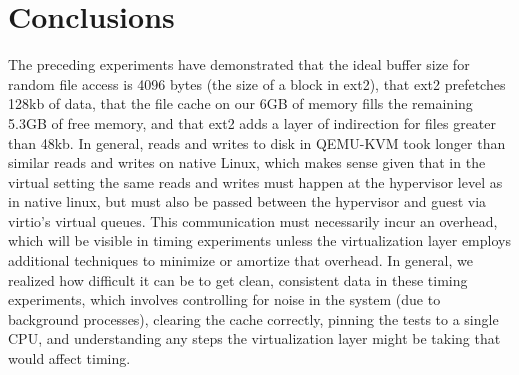 \documentclass[letterpaper,twocolumn,10pt]{article}
\begin{document}
\section{Conclusions}
The preceding experiments have demonstrated that the ideal buffer size for random file access is 4096 bytes (the size of a block in ext2), that ext2 prefetches 128kb of data, that the file cache on our 6GB of memory fills the remaining 5.3GB of free memory, and that ext2 adds a layer of indirection for files greater than 48kb. In general, reads and writes to disk in QEMU-KVM took longer than similar reads and writes on native Linux, which makes sense given that in the virtual setting the same reads and writes must happen at the hypervisor level as in native linux, but must also be passed between the hypervisor and guest via virtio's virtual queues. This communication must necessarily incur an overhead, which will be visible in timing experiments unless the virtualization layer employs additional techniques to minimize or amortize that overhead. In general, we realized how difficult it can be to get clean, consistent data in these timing experiments, which involves controlling for noise in the system (due to background processes), clearing the cache correctly, pinning the tests to a single CPU, and understanding any steps the virtualization layer might be taking that would affect timing. 


\end{document}
